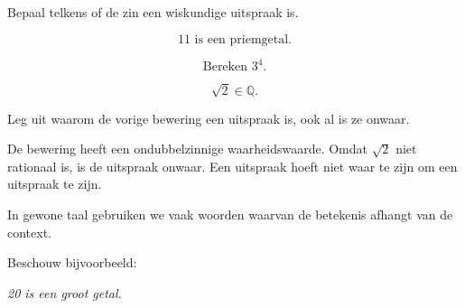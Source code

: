 \documentclass{ximera}
\begin{document}
\begin{oefening}{\oefB \ESS}

Bepaal telkens of de zin een wiskundige uitspraak is.

\begin{question}
\[
11\text{ is een priemgetal.}
\]

\begin{multipleChoice}
\end{multipleChoice}
\end{question}

\begin{question}
\[
\text{Bereken }3^4.
\]

\begin{multipleChoice}
\end{multipleChoice}
\end{question}

\begin{question}
\[
\sqrt{2}\in\mathbb{Q}.
\]

\begin{multipleChoice}
\end{multipleChoice}
\end{question}

\begin{question}
Leg uit waarom de vorige bewering een uitspraak is, ook al is ze onwaar.

\begin{oplossing}
De bewering heeft een ondubbelzinnige waarheidswaarde.
Omdat $\sqrt{2}$ niet rationaal is, is de uitspraak onwaar.
Een uitspraak hoeft niet waar te zijn om een uitspraak te zijn.
\end{oplossing}
\end{question}

\end{oefening}



In gewone taal gebruiken we vaak woorden waarvan de betekenis afhangt
van de context.

Beschouw bijvoorbeeld:

\begin{center}
\textit{20 is een groot getal.}
\end{center}
\end{document}
